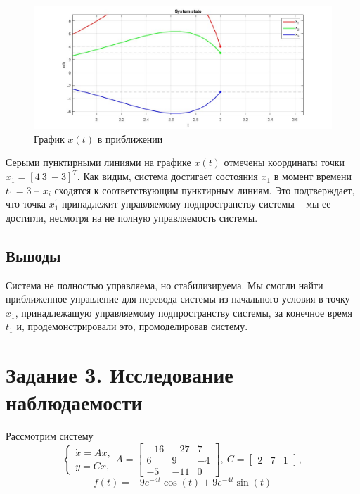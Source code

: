 \documentclass[a4paper, 12pt]{article}
\begin{document}
    \begin{figure}[H]
        \centering
        \includegraphics[scale=0.44]{task_2_x_t_close.jpg}
        \captionsetup{skip=0pt}
        \caption{График $x(t)$ в приближении}
        \label{fig:task_2_modeling_2}
    \end{figure}
    \noindent Серыми пунктирными линиями на графике $x(t)$ отмечены координаты точки $x_1=\left[4\ 3\ -3\right]^T$.
    Как видим, система достигает состояния $x_1$ в момент времени $t_1=3$ -- $x_i$ сходятся к соответствующим пунктирным линиям.
    Это подтверждает, что точка $x_1^{\prime}$ принадлежит управляемому подпространству системы -- мы ее достигли, несмотря на не полную управляемость системы.


    \subsection{Выводы}
    Система не полностью управляема, но стабилизируема. Мы смогли найти приближенное управление для перевода системы из начального условия
    в точку $x_1$, принадлежащую управляемому подпространству системы, за конечное время $t_1$ и, продемонстрировали это, промоделировав систему.


    \section{Задание 3. Исследование наблюдаемости}
    Рассмотрим систему
    $$
    \begin{cases}
        \dot{x}=Ax,\\
        y=Cx,
    \end{cases} A=\begin{bmatrix}
        -16 &-27 &7\\
        6 &9 &-4\\
        -5 &-11 &0
    \end{bmatrix},\ C=\begin{bmatrix}
        2 &7 &1
    \end{bmatrix},
    $$
    $$f(t)=-9e^{-4t}\cos{(t)}+9e^{-4t}\sin{(t)}$$
\end{document}
